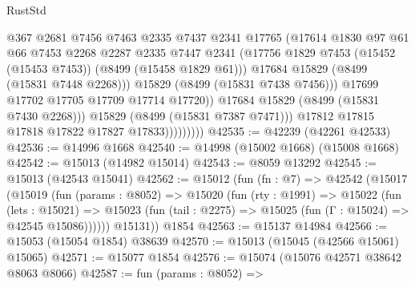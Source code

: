 \begin{lexlean}{RustStd}
\begin{coremodule}
                                @367
                                @2681
                                @7456
                                @7463
                                @2335
                                @7437
                                @2341
                                @17765
                                (@17614
                                  @1830
                                  @97
                                  @61
                                  @66
                                  @7453
                                  @2268
                                  @2287
                                  @2335
                                  @7447
                                  @2341
                                  (@17756
                                    @1829
                                    @7453
                                    (@15452 (@15453 @7453))
                                    (@8499 (@15458 @1829 @61)))
                                  @17684
                                  @15829
                                  (@8499 (@15831 @7448 @2268)))
                                @15829
                                (@8499 (@15831 @7438 @7456)))
                              @17699
                              @17702
                              @17705
                              @17709
                              @17714
                              @17720))
                          @17684
                          @15829
                          (@8499 (@15831 @7430 @2268)))
                        @15829
                        (@8499 (@15831 @7387 @7471)))
                      @17812
                      @17815
                      @17818
                      @17822
                      @17827
                      @17833)))))))))
@42535 := @42239 (@42261 @42533)
@42536 := @14996 @1668
@42540 := @14998 (@15002 @1668) (@15008 @1668)
@42542 := @15013 (@14982 @15014)
@42543 := @8059 @13292
@42545 := @15013 (@42543 @15041)
@42562 := @15012
    (fun (fn : @7) =>
    @42542
      (@15017
        (@15019
          (fun (params : @8052) =>
          @15020
            (fun (rty : @1991) =>
            @15022
              (fun (lets : @15021) =>
              @15023 (fun (tail : @2275) => @15025 (fun (Γ : @15024) => @42545 @15086))))))
        @15131))
    @1854
@42563 := @15137 @14984
@42566 := @15053 (@15054 @1854) @38639
@42570 := @15013 (@15045 (@42566 @15061) @15065)
@42571 := @15077 @1854
@42576 := @15074 (@15076 @42571 @38642 @8063 @8066)
@42587 := fun (params : @8052) =>

\end{coremodule}
\end{lexlean}
